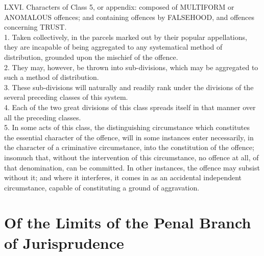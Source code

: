 \documentclass[12pt]{report}
\begin{document}
LXVI. Characters of Class 5, or appendix: composed of MULTIFORM or
ANOMALOUS offences; and containing offences by FALSEHOOD, and offences
concerning TRUST.\\
1. Taken collectively, in the parcels marked out by their popular
appellations, they are incapable of being aggregated to any systematical
method of distribution, grounded upon the mischief of the offence.\\
2. They may, however, be thrown into sub-divisions, which may be
aggregated to such a method of distribution.\\
3. These sub-divisions will naturally and readily rank under the
divisions of the several preceding classes of this system.\\
4. Each of the two great divisions of this class spreads itself in that
manner over all the preceding classes.\\
5. In some acts of this class, the distinguishing circumstance which
constitutes the essential character of the offence, will in some
instances enter necessarily, in the character of a criminative
circumstance, into the constitution of the offence; insomuch that,
without the intervention of this circumstance, no offence at all, of
that denomination, can be committed. In other instances, the offence may
subsist without it; and where it interferes, it comes in as an
accidental independent circumstance, capable of constituting a ground of
aggravation.

\chapter{Of the Limits of the Penal Branch of
Jurisprudence}
\end{document}
